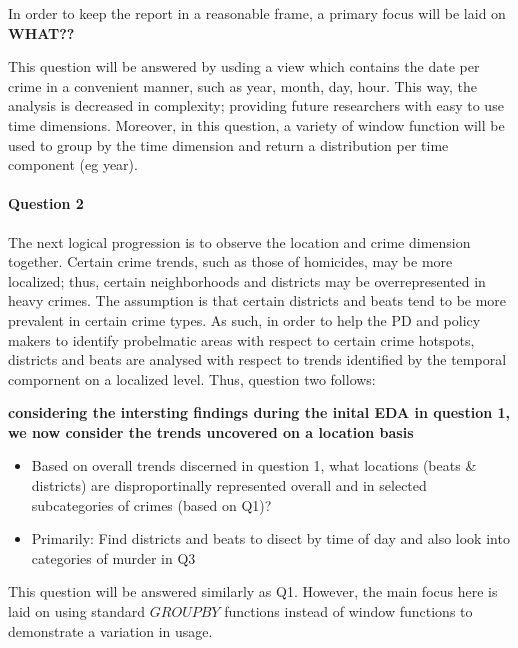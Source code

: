 \documentclass[a4paper]{article}
\begin{document}
In order to keep the report in a reasonable frame, a primary focus will be laid on \textbf{WHAT??}

This question will be answered by usding a view which contains the date per crime in a convenient manner, such as year, month, day, hour. This way, the analysis is decreased in complexity; providing future researchers with easy to use time dimensions. Moreover, in this question, a variety of window function will be used to group by the time dimension and return a distribution per time component (eg year).

\paragraph{Question 2} The next logical progression is to observe the location and crime dimension together. Certain crime trends, such as those of homicides, may be more localized; thus, certain neighborhoods and districts may be overrepresented in heavy crimes. The assumption is that certain districts and beats tend to be more prevalent in certain crime types. As such, in order to help the PD and policy makers to identify probelmatic areas with respect to certain crime hotspots, districts and beats are analysed with respect to trends identified by the temporal compornent on a localized level. Thus, question two follows:


\textbf{considering the intersting findings during the inital EDA in question 1, we now consider the trends uncovered on a location basis}
\begin{itemize}
  \item Based on overall trends discerned in question 1, what locations (beats \& districts) are disproportinally represented overall and in selected subcategories of crimes (based on Q1)?
  \item Primarily: Find districts and beats to disect by time of day and also look into categories of murder in Q3
\end{itemize}

This question will be answered similarly as Q1. However, the main focus here is laid on using standard $GROUP BY$ functions instead of window functions to demonstrate a variation in usage. 
\end{document}
